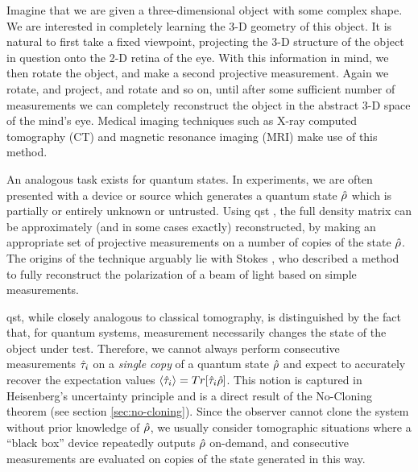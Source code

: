 Imagine that we are given a three-dimensional object with some complex shape. We are interested in completely learning the 3-D geometry of this object. It is natural to first take a fixed viewpoint, projecting the 3-D structure of the object in question onto the 2-D retina of the eye. With this information in mind, we then rotate the object, and make a second projective measurement. Again we rotate, and project, and rotate and so on, until after some sufficient number of measurements we can completely reconstruct the object in the abstract 3-D space of the mind's eye. Medical imaging techniques such as X-ray computed tomography (CT) and magnetic resonance imaging (MRI) make use of this method.

An analogous task exists for quantum states. In experiments, we are often presented with a device or source which generates a quantum state $\hat{\rho}$ which is partially or entirely unknown or untrusted.  Using \gls{qst} \cite{Nielsen2004, James2001}, the full density matrix can be approximately (and in some cases exactly) reconstructed, by making an appropriate set of projective measurements on a number of copies of the state $\hat{\rho}$.  
The origins of the technique arguably lie with Stokes \cite{Stokes1852}, who described a method to fully reconstruct the polarization of a beam of light based on simple measurements.

\gls{qst}, while closely analogous to classical tomography, is distinguished by the fact that, for quantum systems, measurement necessarily changes the state of the object under test. Therefore, we cannot always perform consecutive measurements $\hat{\tau}_i$ on a \emph{single copy} of a quantum state $\hat{\rho}$ and expect to accurately recover the expectation values $\langle \hat{\tau}_i \rangle = Tr[\hat{\tau}_i \hat{\rho}]$. 
This notion is captured in Heisenberg's uncertainty principle and is a direct result of the No-Cloning theorem (see section \ref{sec:no-cloning}). Since the observer cannot clone the system without prior knowledge of $\hat{\rho}$, we usually consider tomographic situations where a ``black box'' device repeatedly outputs $\hat{\rho}$ on-demand, and consecutive measurements are evaluated on copies of the state generated in this way.

